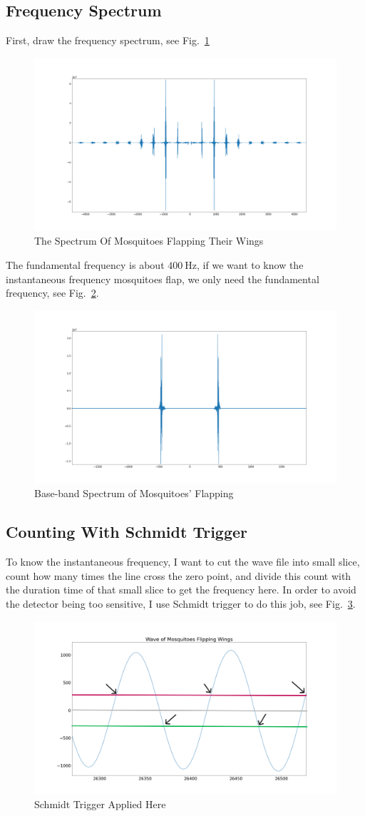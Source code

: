 \documentclass{article}
\begin{document}
\subsection{Frequency Spectrum}
First, draw the frequency spectrum, see Fig.~\ref{fig:MosquitoSpec}
\begin{figure}[!h]
	\centering
	\includegraphics[width=3 in]{../pic/MosquitoSpec.png}
	\caption{The Spectrum Of Mosquitoes Flapping Their Wings}
	\label{fig:MosquitoSpec}
\end{figure}
The fundamental frequency is about $400~\mathrm{Hz}$, if we want to know the instantaneous frequency mosquitoes flap, we only need the fundamental frequency, see Fig.~\ref{fig:FilteredMosquito}.
\begin{figure}[!h]
	\centering
	\includegraphics[width=3 in]{../pic/FilteredMosquitoFlap.png}
	\caption{Base-band Spectrum of Mosquitoes' Flapping}
	\label{fig:FilteredMosquito}
\end{figure}

\subsection{Counting With Schmidt Trigger}
To know the instantaneous frequency, I want to cut the wave file into small slice, count how many times the line cross the zero point, and divide this count with the duration time of that small slice to get the frequency here. In order to avoid the detector being too sensitive, I use Schmidt trigger to do this job, see Fig.~\ref{fig:CountFlapping}.

\begin{figure}[!h]
	\centering
	\includegraphics[width=3 in]{../pic/CountFlapping.png}
	\caption{Schmidt Trigger Applied Here}
	\label{fig:CountFlapping}
\end{figure}
\end{document}
